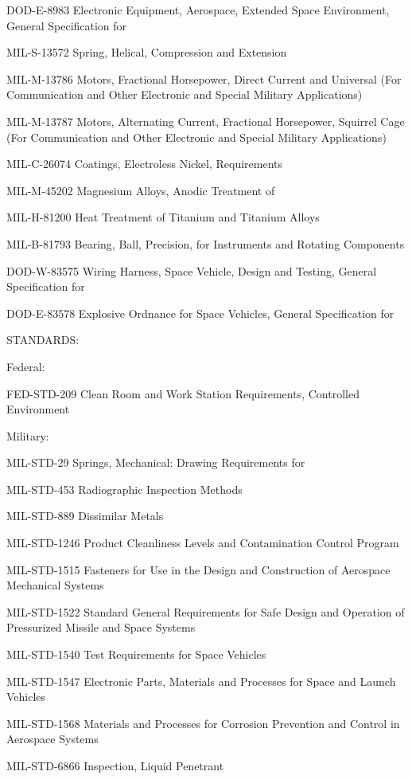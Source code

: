 \documentclass[12pt]{article}
\begin{document}
DOD-E-8983 Electronic Equipment, Aerospace, Extended Space Environment, General Specification for

MIL-S-13572 Spring, Helical, Compression and Extension

MIL-M-13786 Motors, Fractional Horsepower, Direct Current and Universal (For Communication and Other Electronic and Special Military Applications)

MIL-M-13787 Motors, Alternating Current, Fractional Horsepower, Squirrel Cage (For Communication and Other Electronic and Special Military Applications)

MIL-C-26074 Coatings, Electroless Nickel, Requirements

MIL-M-45202 Magnesium Alloys, Anodic Treatment of

MIL-H-81200 Heat Treatment of Titanium and Titanium Alloys

MIL-B-81793 Bearing, Ball, Precision, for Instruments and Rotating Components

DOD-W-83575 Wiring Harness, Space Vehicle, Design and Testing, General Specification for

DOD-E-83578 Explosive Ordnance for Space Vehicles, General Specification for

STANDARDS:

Federal:

FED-STD-209 Clean Room and Work Station Requirements, Controlled Environment

Military:

MIL-STD-29 Springs, Mechanical: Drawing Requirements for

MIL-STD-453 Radiographic Inspection Methods

MIL-STD-889 Dissimilar Metals

MIL-STD-1246 Product Cleanliness Levels and Contamination Control Program

MIL-STD-1515 Fasteners for Use in the Design and Construction of Aerospace Mechanical Systems

MIL-STD-1522 Standard General Requirements for Safe Design and Operation of Pressurized Missile and Space Systems

MIL-STD-1540 Test Requirements for Space Vehicles

MIL-STD-1547 Electronic Parts, Materials and Processes for Space and Launch Vehicles

MIL-STD-1568 Materials and Processes for Corrosion Prevention and Control in Aerospace Systems

MIL-STD-6866 Inspection, Liquid Penetrant
\end{document}
